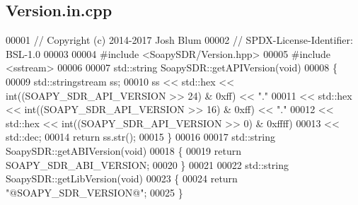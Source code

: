 \subsection{Version.\+in.\+cpp}
\label{Version_8in_8cpp_source}

\begin{DoxyCode}
00001 \textcolor{comment}{// Copyright (c) 2014-2017 Josh Blum}
00002 \textcolor{comment}{// SPDX-License-Identifier: BSL-1.0}
00003 
00004 \textcolor{preprocessor}{#include <SoapySDR/Version.hpp>}
00005 \textcolor{preprocessor}{#include <sstream>}
00006 
00007 std::string SoapySDR::getAPIVersion(\textcolor{keywordtype}{void})
00008 \{
00009     std::stringstream ss;
00010     ss << std::hex << int((SOAPY\_SDR\_API\_VERSION >> 24) & 0xff) << \textcolor{stringliteral}{"."}
00011        << std::hex << int((SOAPY\_SDR\_API\_VERSION >> 16) & 0xff) << \textcolor{stringliteral}{"."}
00012        << std::hex << int((SOAPY\_SDR\_API\_VERSION >> 0) & 0xffff)
00013        << std::dec;
00014     \textcolor{keywordflow}{return} ss.str();
00015 \}
00016 
00017 std::string SoapySDR::getABIVersion(\textcolor{keywordtype}{void})
00018 \{
00019     \textcolor{keywordflow}{return} SOAPY_SDR_ABI_VERSION;
00020 \}
00021 
00022 std::string SoapySDR::getLibVersion(\textcolor{keywordtype}{void})
00023 \{
00024     \textcolor{keywordflow}{return} \textcolor{stringliteral}{"@SOAPY\_SDR\_VERSION@"};
00025 \}
\end{DoxyCode}

